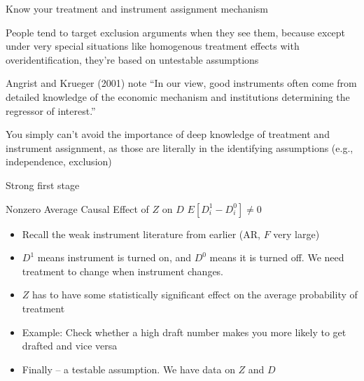 \documentclass{beamer}
\begin{document}
\begin{frame}{Know your treatment and instrument assignment mechanism}

People tend to target exclusion arguments when they see them, because except under very special situations like homogenous treatment effects with overidentification, they're based on untestable assumptions

\bigskip

Angrist and Krueger (2001) note ``In our view, good instruments often come from detailed knowledge of the economic mechanism and institutions determining the regressor of interest.''  

\bigskip

You simply can't avoid the importance of deep knowledge of treatment and instrument assignment, as those are literally in the identifying assumptions (e.g., independence, exclusion)

\end{frame}


\begin{frame}{Strong first stage}
	
	\begin{block}{Nonzero Average Causal Effect of $Z$ on $D$}
	$E[D^1_{i} - D^0_{i}]\neq{0}$
	\end{block}
				
\begin{itemize}
\item Recall the weak instrument literature from earlier (AR, $F$ very large)
\item $D^1$ means instrument is turned on, and $D^0$ means it is turned off. We need treatment to change when instrument changes.
\item $Z$ has to have some statistically significant effect on the average probability of treatment
\item Example: Check whether a high draft number makes you more likely to get drafted and vice versa
\item Finally -- a testable assumption. We have data on $Z$ and $D$
\end{itemize}

\end{frame}			
\end{document}
